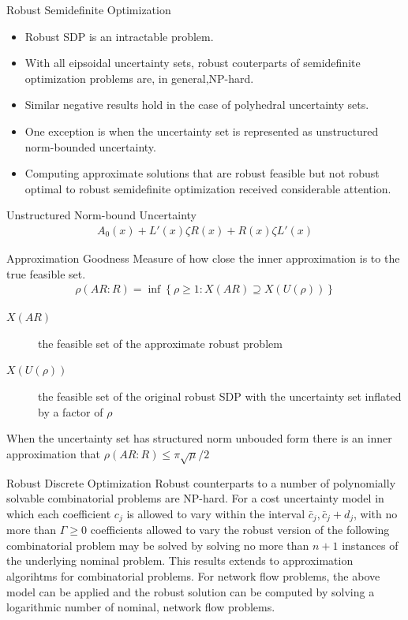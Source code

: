 \documentclass{beamer}
\begin{document}
\begin{frame}{Robust Semidefinite Optimization}
\begin{itemize}
\item Robust SDP is an intractable problem.
\item With all eipsoidal uncertainty sets, robust couterparts of semidefinite optimization problems are, in general,NP-hard.
\item Similar negative results hold in the case of polyhedral uncertainty sets.
\item One exception is when the uncertainty set is represented as unstructured norm-bounded uncertainty.
\item Computing approximate solutions that are robust feasible but not robust optimal to robust semidefinite optimization received considerable attention.
\end{itemize}
\end{frame}

\begin{frame}{}
\begin{block}{Unstructured Norm-bound Uncertainty}
\begin{align*}
A_{0}(x) + L'(x)\zeta R(x) + R(x)\zeta L'(x)
\end{align*}
\end{block}
\end{frame}

\begin{frame}{Approximation Goodness}
Measure of how close the inner approximation is to the true feasible set.
\begin{align*}
\rho(AR:R) = \inf \left\{\rho \geq 1 : X(AR) \supseteq X(U(\rho)) \right\}
\end{align*}
\begin{description}
\item [$X(AR)$] the feasible set of the approximate robust problem
\item [$X(U(\rho))$] the feasible set of the original robust SDP with the uncertainty set inflated by a factor of $\rho$
\end{description}
When the uncertainty set has structured norm unbouded form there is an inner approximation that $\rho(AR:R) \leq \pi \sqrt{\mu}/2$
\end{frame}

\begin{frame}{Robust Discrete Optimization}
Robust counterparts to a number of polynomially solvable combinatorial problems are NP-hard.
For a cost uncertainty model in which each coefficient $c_j$ is allowed to vary within the interval $\bar{c}_{j}, \bar{c}_{j} + d_{j}$, with no more than $\Gamma \geq 0$ coefficients allowed to vary the robust version of the following combinatorial problem may be solved by solving no more than $n+1$ instances of the underlying nominal problem. This results extends to approximation algorihtms for combinatorial problems. For network flow problems, the above model can be applied and the robust solution can be computed by solving a logarithmic number of nominal, network flow problems.
\end{frame}
\end{document}
